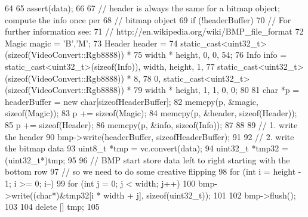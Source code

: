 \begin{DoxyCode}
64 {
65     assert(data);
66 
67     // header is always the same for a bitmap object; compute the info once per
68     //   bitmap object
69     if (!headerBuffer) {
70         // For further information see:
71         //   http://en.wikipedia.org/wiki/BMP_file_format
72         Magic magic = {{'B','M'}};
73         Header header = {
74             static_cast<uint32_t>(sizeof(VideoConvert::Rgb8888)) *
75             width * height, 0, 0, 54};
76         Info info = {static_cast<uint32_t>(sizeof(Info)), width, height, 1,
77                      static_cast<uint32_t>(sizeof(VideoConvert::Rgb8888)) * 8,
78                      0, static_cast<uint32_t>(sizeof(VideoConvert::Rgb8888)) *
79                      width * height, 1, 1, 0, 0};
80 
81         char *p = headerBuffer = new char[sizeofHeaderBuffer];
82         memcpy(p, &magic, sizeof(Magic));
83         p += sizeof(Magic);
84         memcpy(p, &header, sizeof(Header));
85         p += sizeof(Header);
86         memcpy(p, &info,   sizeof(Info));
87     }
88 
89     // 1.  write the header
90     bmp->write(headerBuffer, sizeofHeaderBuffer);
91 
92     // 2.  write the bitmap data
93     uint8_t *tmp = vc.convert(data);
94     uint32_t *tmp32 = (uint32_t*)tmp;
95 
96     // BMP start store data left to right starting with the bottom row
97     // so we need to do some creative flipping
98     for (int i = height - 1; i >= 0; i--)
99         for (int j = 0; j < width; j++)
100             bmp->write((char*)&tmp32[i * width + j], sizeof(uint32_t));
101 
102     bmp->flush();
103 
104     delete [] tmp;
105 }
\end{DoxyCode}


